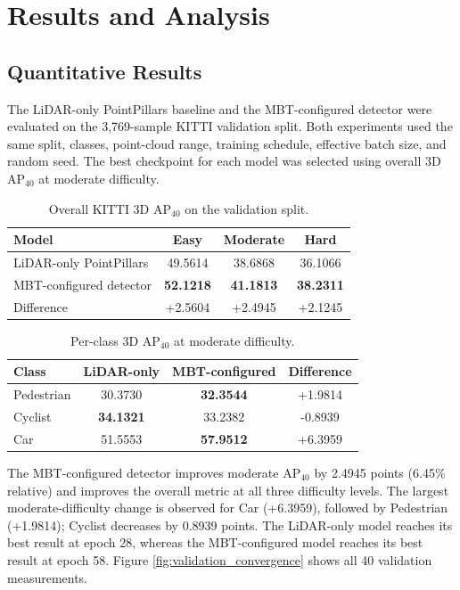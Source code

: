 \section{Results and Analysis}

\subsection{Quantitative Results}

The LiDAR-only PointPillars baseline and the MBT-configured detector were
evaluated on the 3,769-sample KITTI validation split. Both experiments used
the same split, classes, point-cloud range, training schedule, effective batch
size, and random seed. The best checkpoint for each model was selected using
overall 3D AP$_{40}$ at moderate difficulty.

\begin{table}[ht]
\centering
\caption{Overall KITTI 3D AP$_{40}$ on the validation split.}
\label{tab:overall_results}
\begin{tabular}{lccc}
\hline
Model & Easy & Moderate & Hard \\
\hline
LiDAR-only PointPillars & 49.5614 & 38.6868 & 36.1066 \\
MBT-configured detector & \textbf{52.1218} & \textbf{41.1813} & \textbf{38.2311} \\
\hline
Difference & +2.5604 & +2.4945 & +2.1245 \\
\hline
\end{tabular}
\end{table}

\begin{table}[ht]
\centering
\caption{Per-class 3D AP$_{40}$ at moderate difficulty.}
\label{tab:per_class_results}
\begin{tabular}{lccc}
\hline
Class & LiDAR-only & MBT-configured & Difference \\
\hline
Pedestrian & 30.3730 & \textbf{32.3544} & +1.9814 \\
Cyclist & \textbf{34.1321} & 33.2382 & -0.8939 \\
Car & 51.5553 & \textbf{57.9512} & +6.3959 \\
\hline
\end{tabular}
\end{table}

The MBT-configured detector improves moderate AP$_{40}$ by 2.4945 points
(6.45\% relative) and improves the overall metric at all three difficulty
levels. The largest moderate-difficulty change is observed for Car
(+6.3959), followed by Pedestrian (+1.9814); Cyclist decreases by 0.8939
points. The LiDAR-only model reaches its best result at epoch 28, whereas the
MBT-configured model reaches its best result at epoch 58. Figure
\ref{fig:validation_convergence} shows all 40 validation measurements.

